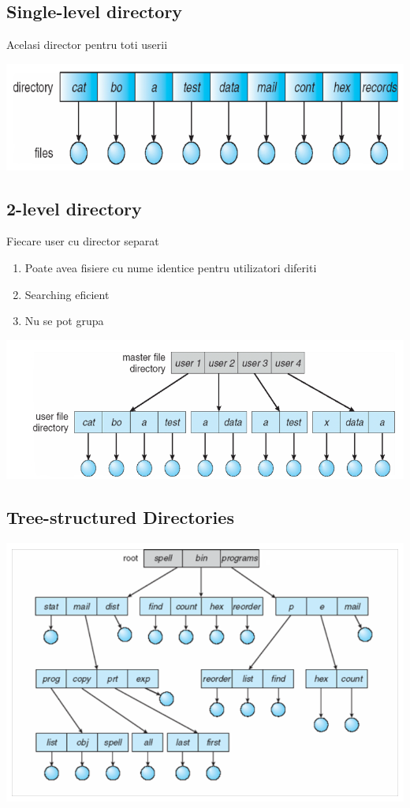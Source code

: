 \documentclass{article}
\begin{document}
\subsection*{Single-level directory}
Acelasi director pentru toti userii
\begin{center}
    \includegraphics[scale=0.4]{42-sld.png}
\end{center}

\subsection*{2-level directory}
Fiecare user cu director separat
\begin{enumerate}
    \item Poate avea fisiere cu nume identice pentru utilizatori diferiti
    \item Searching eficient
    \item Nu se pot grupa
\end{enumerate}
\begin{center}
    \includegraphics[scale=0.4]{43-tld.png}
\end{center}

\subsection*{Tree-structured Directories}
\begin{center}
    \includegraphics[scale=0.4]{44-tsd.png}
\end{center}
\end{document}
